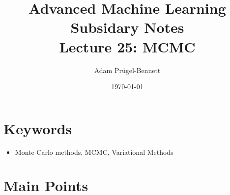 \documentclass[11pt]{article}
\author{Adam Prügel-Bennett}
\date{\today}
\title{Advanced Machine Learning Subsidary Notes\\\medskip
\large Lecture 25: MCMC}
\begin{document}
\maketitle

\section{Keywords}
\label{sec:org33f9775}
\begin{itemize}
\item Monte Carlo methods, MCMC, Variational Methods
\end{itemize}

\section{Main Points}
\label{sec:org874c646}
\end{document}
